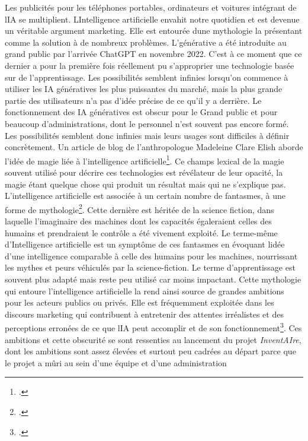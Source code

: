 Les publicités pour les téléphones portables, ordinateurs et voitures
intégrant de l\textquotesingle IA se multiplient.
L\textquotesingle Intelligence artificielle envahit notre quotidien et
est devenue un véritable argument marketing. Elle est entourée
d\textquotesingle une mythologie la présentant comme la solution à de
nombreux problèmes. L'\gls{générative} a été introduite au grand public par
l'arrivée ChatGPT en novembre 2022. C'est à ce moment que ce dernier a pour la première fois réellement pu s'approprier une technologie basée sur de
l'\gls{apprentissage}. Les possibilités semblent infinies lorsqu'on
commence à utiliser les IA génératives les plus puissantes du marché, mais la plus grande partie des utilisateurs n'a pas d'idée
précise de ce qu'il y a derrière. Le fonctionnement des IA génératives
est obscur pour le Grand public et pour beaucoup d'administrations, dont
le personnel n'est souvent pas encore formé. Les possibilités semblent
donc infinies mais leurs usages sont difficiles à définir concrètement.
Un article de blog de l'anthropologue Madeleine Clare Elish aborde
l'idée de magie liée à l'intelligence artificielle\footcite{elish_dont_2018}.
Ce champs lexical de la magie souvent utilisé pour décrire ces
technologies est révélateur de leur opacité, la magie étant
quelque chose qui produit un résultat mais qui ne s'explique
pas. L'intelligence artificielle est associée à un certain nombre de
fantasmes, à une forme de mythologie\footcite{duca_artificial_2023}. Cette dernière est
héritée de la science fiction, dans laquelle l'imaginaire des machines
dont les capacités égaleraient celles des humains et prendraient le
contrôle a été vivement exploité. Le terme-même d'Intelligence
artificielle est un symptôme de ces fantasmes en évoquant
l\textquotesingle idée d'une intelligence comparable à celle des humains
pour les machines, nourrissant les mythes et peurs véhiculés par la
science-fiction. Le terme d'\gls{apprentissage} est souvent plus
adapté mais reste peu utilisé car moins impactant. Cette mythologie qui
entoure l'intelligence artificielle la rend ainsi source de grandes
ambitions pour les acteurs publics ou privés. Elle
est fréquemment exploitée dans les discours marketing qui contribuent à
entretenir des attentes irréalistes et des perceptions erronées de ce
que l\textquotesingle IA peut accomplir et de son
fonctionnement\footcite{duca_artificial_2023}. Ces ambitions et cette
obscurité se sont ressenties au lancement du projet \emph{InventAIre},
dont les ambitions sont assez élevées et surtout peu cadrées au départ
parce que le projet a mûri au sein d'une équipe et d'une administration
